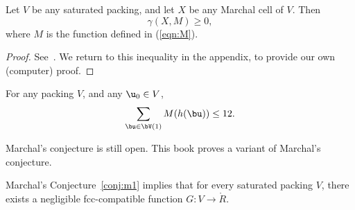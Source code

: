 \begin{theorem}
Let $V$ be any saturated packing, and let $X$ be any Marchal cell of $V$.  Then
\begin{equation}\label{eqn:mfe}
\gamma(X,M)\ge 0,
\end{equation}
where $M$ is the function defined in (\ref{eqn:M}).
\end{theorem}

\begin{proof}  See~\cite{marchal:2008}.  We return to this inequality in the appendix,
to provide our own (computer) proof.
\end{proof}


\begin{conjecture}[Marchal]\label{conj:m1} 
For any packing $ V$, and
any $ \u_0\in V$,
\begin{displaymath}
\sum_{\bu\in \bV(1)} M(h(\bu)) \le 12.
\end{displaymath}
\end{conjecture}

Marchal's conjecture is still open.  This book proves a variant of
Marchal's conjecture.

\begin{theorem}\label{theorem:mk1}
Marchal's Conjecture~\ref{conj:m1} implies
that for every saturated packing $V$, there exists a negligible fcc-compatible function
$G:V\to \ring{R}$.
\end{theorem}



